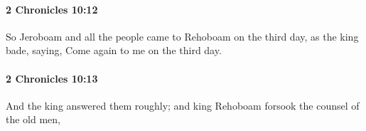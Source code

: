 		\paragraph{2 Chronicles 10:12} %
			\label{2CHRONICLES-10-12}

			So Jeroboam and all the people came to Rehoboam on the third day, as the king bade, saying, Come again to me on the third day.


		\paragraph{2 Chronicles 10:13} %
			\label{2CHRONICLES-10-13}

			And the king answered them roughly; and king Rehoboam forsook the counsel of the old men,


